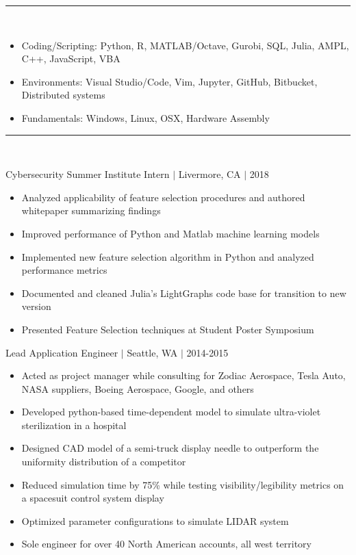 \documentclass[11pt]{article}
\begin{document}
\vspace{8pt}\hrule\vspace{10pt}
\\
\vspace{-10pt}

\begin{itemize}
\item Coding/Scripting: Python, R, MATLAB/Octave, Gurobi, SQL, Julia, AMPL, C++, JavaScript, VBA
\item Environments: Visual Studio/Code, Vim, Jupyter, GitHub, Bitbucket, Distributed systems
\item Fundamentals: Windows, Linux, OSX, Hardware Assembly
\end{itemize}

\vspace{8pt}\hrule\vspace{10pt}
\\
\vspace{-8pt}

\hfill{Cybersecurity Summer Institute Intern $|$ Livermore, CA $|$ 2018}

\begin{itemize}
\item Analyzed applicability of feature selection procedures and authored whitepaper summarizing findings
\item Improved performance of Python and Matlab machine learning models
\item Implemented new feature selection algorithm in Python and analyzed performance metrics
\item Documented and cleaned Julia's LightGraphs code base for transition to new version
\item Presented Feature Selection techniques at Student Poster Symposium
\end{itemize}

\hfill { Lead Application Engineer $|$ Seattle, WA $|$ 2014-2015}

\begin{itemize}
\item Acted as project manager while consulting for Zodiac Aerospace, Tesla Auto, NASA suppliers, Boeing Aerospace, Google, and others
\item Developed python-based time-dependent model to simulate ultra-violet sterilization in a hospital
\item Designed CAD model of a semi-truck display needle to outperform the uniformity distribution of a competitor
\item Reduced simulation time by 75\% while testing visibility/legibility metrics on a spacesuit control system display
\item Optimized parameter configurations to simulate LIDAR system
\item Sole engineer for over 40 North American accounts, all west territory
\end{itemize}
\end{document}

